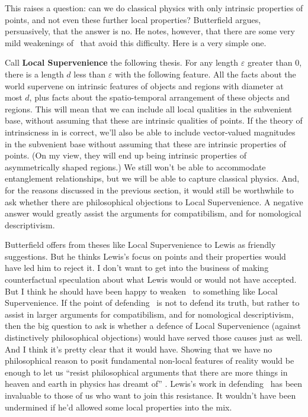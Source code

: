 This raises a question: can we do classical physics with only  intrinsic properties of points, and not even these further local properties? Butterfield argues, persuasively, that the answer is no. He notes, however, that there are some very mild weakenings of \HS\  that avoid this difficulty. Here is a very simple one.

Call \textbf{Local Supervenience} the following thesis. For any length $\varepsilon$ greater than 0, there is a length $d$ less than $\varepsilon$ with the following feature. All the facts about the world supervene on intrinsic features of objects and regions with diameter at most $d$, plus facts about the spatio-temporal arrangement of these objects and regions. This will mean that we can include all local qualities in the subvenient base, without assuming that these are intrinsic qualities of points. If the theory of intrinsicness in \citet{Weatherson2006-WEATAM} is correct, we'll also be able to include vector-valued magnitudes in the subvenient base without assuming that these are intrinsic properties of points. (On my view, they will end up being intrinsic properties of asymmetrically shaped regions.) We still won't be able to accommodate entanglement relationships, but we will be able to capture classical physics. And, for the reasons discussed in the previous section, it would still be worthwhile to ask whether there are philosophical objections to Local Supervenience. A negative answer would greatly assist the arguments for compatibilism, and for nomological descriptivism.

 Butterfield offers from theses like Local Supervenience to Lewis as friendly suggestions. But he thinks Lewis's focus on  points and their properties would have led him to reject it. I don't want to get into the business of making counterfactual speculation about what Lewis would or would not have accepted. But I think he should have been happy to weaken \HS\ to something like Local Supervenience. If the point of defending \HS\ is not to defend its truth, but rather to assist in larger arguments for compatibilism, and for nomological descriptivism, then the big question to ask is whether a defence of Local Supervenience (against distinctively philosophical objections)  would have served those causes just as well.  And I think it's pretty clear that it would have. Showing that we have no philosophical reason to posit fundamental non-local features of reality would be enough to let us ``resist philosophical arguments that there are more things in heaven and earth in physics has dreamt of'' \citep[474]{Lewis1994a}. Lewis's work in defending \HS\ has been invaluable to those of us who want to join this resistance. It wouldn't have been undermined if he'd allowed some local properties into the mix.
